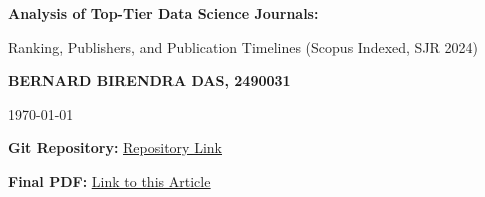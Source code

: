 \documentclass[a4paper,12pt,onecolumn]{article}
\newcommand{\ulhref}[2]{\href{#1}{\uline{#2}}}
\begin{document}
\begin{titlepage}
    \centering
    {\Huge \bfseries Analysis of Top-Tier Data Science Journals: \par}
    \vspace{0.2cm}
    {\Large Ranking, Publishers, and Publication Timelines (Scopus Indexed, SJR 2024)\par}
    \vspace{0.5cm}
    {\Large \textbf{BERNARD BIRENDRA DAS, 2490031}\par}
    \vspace{0.5cm}
    {\large \today\par}
    \vspace{0.4cm}
    
    \noindent
    \textbf{Git Repository:} \ulhref{https://github.com/bernardbdas/analysis-of-top-tier-data-science-journals-2024}{Repository Link} \par
    \vspace{0.2cm}
    \textbf{Final PDF:} \ulhref{https://github.com/bernardbdas/analysis-of-top-tier-data-science-journals-2024/blob/main/main.pdf}{Link to this Article} \par


\end{titlepage}
\end{document}
